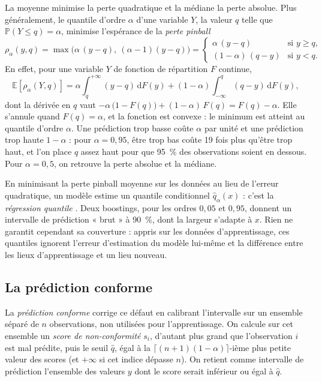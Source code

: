 \documentclass[11pt,a4paper]{article}
\newcommand{\E}{\mathbb{E}}
\newcommand{\dd}{\mathrm{d}}
\begin{document}
La moyenne minimise la perte quadratique et la médiane la perte absolue. Plus généralement, le quantile d'ordre
$\alpha$ d'une variable $Y$, la valeur $q$ telle que $\mathbb{P}(Y \leq q) = \alpha$, minimise l'espérance de la
\emph{perte pinball}
\[
\rho_\alpha(y, q) = \max\big(\alpha\,(y - q),\ (\alpha - 1)(y - q)\big) =
\begin{cases} \alpha\,(y - q) & \text{si } y \geq q, \\ (1 - \alpha)\,(q - y) & \text{si } y < q. \end{cases}
\]
En effet, pour une variable $Y$ de fonction de répartition $F$ continue,
\[
\E[\rho_\alpha(Y, q)] = \alpha\int_{q}^{+\infty}(y - q)\,\dd F(y) + (1 - \alpha)\int_{-\infty}^{q}(q - y)\,\dd F(y),
\]
dont la dérivée en $q$ vaut $-\alpha\,\big(1 - F(q)\big) + (1 - \alpha)\,F(q) = F(q) - \alpha$. Elle s'annule quand
$F(q) = \alpha$, et la fonction est convexe : le minimum est atteint au quantile d'ordre $\alpha$. Une prédiction trop
basse coûte $\alpha$ par unité et une prédiction trop haute $1 - \alpha$ : pour $\alpha = 0{,}95$, être trop bas coûte
19 fois plus qu'être trop haut, et l'on place $q$ assez haut pour que 95~\% des observations soient en dessous. Pour
$\alpha = 0{,}5$, on retrouve la perte absolue et la médiane.

En minimisant la perte pinball moyenne sur les données au lieu de l'erreur quadratique, un modèle estime un quantile
conditionnel $\hat q_\alpha(x)$ : c'est la \emph{régression quantile} \citep{koenker1978}. Deux boostings, pour les
ordres $0{,}05$ et $0{,}95$, donnent un intervalle de prédiction « brut » à 90~\%, dont la largeur s'adapte à $x$. Rien
ne garantit cependant sa couverture : appris sur les données d'apprentissage, ces quantiles ignorent l'erreur
d'estimation du modèle lui-même et la différence entre les lieux d'apprentissage et un lieu nouveau.

\subsection{La prédiction conforme}\label{sec:conforme}

La \emph{prédiction conforme} \citep{vovk2005} corrige ce défaut en calibrant l'intervalle sur un ensemble séparé de
$n$ observations, non utilisées pour l'apprentissage. On calcule sur cet ensemble un \emph{score de non-conformité}
$s_i$, d'autant plus grand que l'observation $i$ est mal prédite, puis le seuil $\hat q$, égal à la
$\lceil (n+1)(1-\alpha)\rceil$-ième plus petite valeur des scores (et $+\infty$ si cet indice dépasse $n$). On retient
comme intervalle de prédiction l'ensemble des valeurs $y$ dont le score serait inférieur ou égal à $\hat q$.
\end{document}
